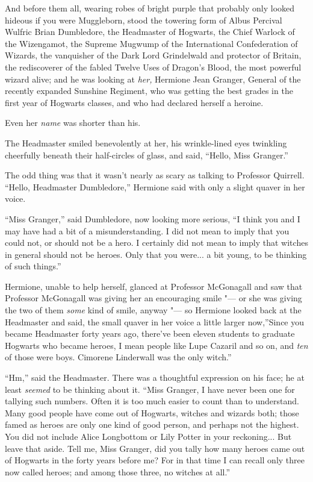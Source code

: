 And before them all, wearing robes of bright purple that probably only
looked hideous if you were Muggleborn, stood the towering form of Albus
Percival Wulfric Brian Dumbledore, the Headmaster of Hogwarts, the Chief
Warlock of the Wizengamot, the Supreme Mugwump of the International
Confederation of Wizards, the vanquisher of the Dark Lord Grindelwald
and protector of Britain, the rediscoverer of the fabled Twelve Uses of
Dragon's Blood, the most powerful wizard alive; and he was looking at
\emph{her,} Hermione Jean Granger, General of the recently expanded
Sunshine Regiment, who was getting the best grades in the first year of
Hogwarts classes, and who had declared herself a heroine.

Even her \emph{name} was shorter than his.

The Headmaster smiled benevolently at her, his wrinkle-lined eyes
twinkling cheerfully beneath their half-circles of glass, and said,
``Hello, Miss Granger.''

The odd thing was that it wasn't nearly as scary as talking to Professor
Quirrell. ``Hello, Headmaster Dumbledore,'' Hermione said with only a
slight quaver in her voice.

``Miss Granger,'' said Dumbledore, now looking more serious, ``I think
you and I may have had a bit of a misunderstanding. I did not mean to
imply that you could not, or should not be a hero. I certainly did not
mean to imply that witches in general should not be heroes. Only that
you were... a bit young, to be thinking of such things.''

Hermione, unable to help herself, glanced at Professor McGonagall and
saw that Professor McGonagall was giving her an encouraging smile "--- or
she was giving the two of them \emph{some} kind of smile, anyway "--- so
Hermione looked back at the Headmaster and said, the small quaver in her
voice a little larger now,''Since you became Headmaster forty years ago,
there've been eleven students to graduate Hogwarts who became heroes, I
mean people like Lupe Cazaril and so on, and \emph{ten} of those were
boys. Cimorene Linderwall was the only witch.''

``Hm,'' said the Headmaster. There was a thoughtful expression on his
face; he at least \emph{seemed} to be thinking about it. ``Miss Granger,
I have never been one for tallying such numbers. Often it is too much
easier to count than to understand. Many good people have come out of
Hogwarts, witches and wizards both; those famed as heroes are only one
kind of good person, and perhaps not the highest. You did not include
Alice Longbottom or Lily Potter in your reckoning... But leave that
aside. Tell me, Miss Granger, did you tally how many heroes came out of
Hogwarts in the forty years before me? For in that time I can recall
only three now called heroes; and among those three, no witches at
all.''

